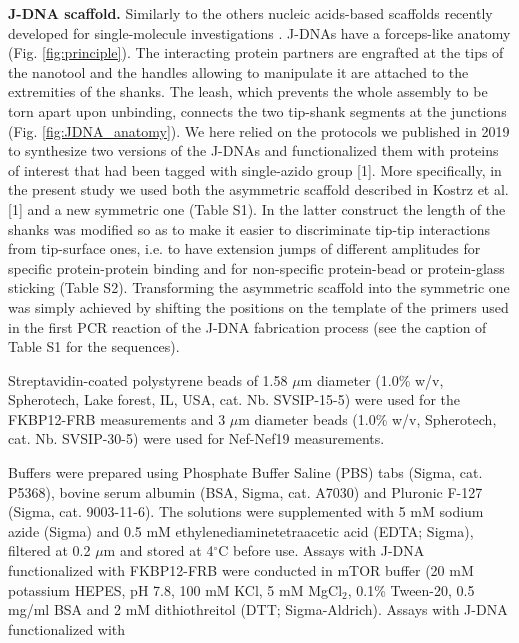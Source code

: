 \documentclass{biophys-new}
\begin{document}
\noindent
\textbf{J-DNA scaffold.} Similarly to the others nucleic acids-based scaffolds recently developed for single-molecule investigations \cite{kostrz2019, yang2016,halvorsen2011, penth2021, li2019, ma2019, mickolajczyk2022, shrestha2021, kilchherr2016}. J-DNAs have a forceps-like anatomy \cite{gosse2019} (Fig. \ref{fig:principle}). The interacting protein partners are engrafted at the tips of the nanotool and the handles allowing to manipulate it are attached to the extremities of the shanks. The leash, which prevents the whole assembly to be torn apart upon unbinding, connects the two tip-shank segments at the junctions (Fig. \ref{fig:JDNA_anatomy}). We here relied on the protocols we published in 2019 to synthesize two versions of the J-DNAs and functionalized them with proteins of interest that had been tagged with single-azido group [1]. More specifically, in the present study we used both the asymmetric scaffold described in Kostrz et al. [1] and a new symmetric one (Table S1). In the latter construct the length of the shanks was modified so as to make it easier to discriminate tip-tip interactions from tip-surface ones, i.e. to have extension jumps of different amplitudes for specific protein-protein binding and for non-specific protein-bead or protein-glass sticking (Table S2). Transforming the asymmetric scaffold into the symmetric one was simply achieved by shifting the positions on the template of the primers used in the first PCR reaction of the J-DNA fabrication process (see the caption of Table S1 for the sequences). 

Streptavidin-coated polystyrene beads of 1.58 $\mu$m diameter (1.0\% w/v, Spherotech,  Lake forest, IL, USA, cat. Nb. SVSIP-15-5) were used for the FKBP12-FRB measurements and 3 $\mu$m diameter beads (1.0\% w/v, Spherotech, cat. Nb. SVSIP-30-5) were used for Nef-Nef19 measurements.%

Buffers were prepared using Phosphate Buffer Saline (PBS) tabs (Sigma, cat. P5368), bovine serum albumin (BSA, Sigma, cat. A7030) and Pluronic F-127 (Sigma, cat. 9003-11-6). The solutions were supplemented with 5 mM sodium azide (Sigma) and 0.5  mM  ethylenediaminetetraacetic acid (EDTA;  Sigma), filtered at 0.2 $\mu$m and stored at 4$^{\circ}$C before use.
Assays with J-DNA functionalized with FKBP12-FRB were conducted in mTOR buffer (20 mM potassium HEPES, pH 7.8, 100 mM KCl, 5 mM MgCl$_2$, 0.1\% Tween-20, 0.5 mg/ml BSA and 2 mM dithiothreitol (DTT; Sigma-Aldrich).
Assays with J-DNA functionalized with
\end{document}
